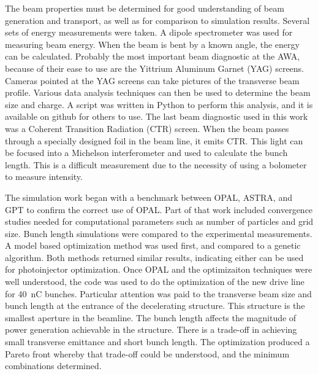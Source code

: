 The beam properties must be determined for good understanding of beam generation and transport, as well as for comparison to simulation results. Several sets of energy measurements were taken. A dipole spectrometer was used for measuring beam energy. 
When the beam is bent by a known angle, the energy can be calculated. 
Probably the most important beam diagnostic at the AWA, 
because of their ease to use are the Yittrium Aluminum Garnet (YAG) screens. 
Cameras pointed at the YAG screens can take pictures of the 
transverse beam profile. 
Various data analysis techniques can then be used to determine 
the beam size and charge. A script was written in Python
to perform this analysis, and it is available on github for others to use. 
The last beam diagnostic used in this work was a Coherent Transition Radiation (CTR) screen. When the beam passes
through a specially designed foil in the beam line, 
it emits CTR. This light can be focused into a Michelson 
interferometer and used to calculate the bunch length. 
This is a difficult measurement due to the necessity of using a 
bolometer to measure intensity. 

The simulation work began with a benchmark between OPAL, ASTRA, and GPT 
to confirm the correct use of OPAL. 
Part of that work included convergence studies needed for computational parameters such as number of particles and grid size.
Bunch length simulations were compared to the experimental 
measurements. 
A model based optimization method was used first, 
and compared to a genetic algorithm. 
Both methods returned similar results, indicating either
can be used for photoinjector optimization.  Once OPAL and the optimizaiton techniques were well understood, the code was used to do the optimization of the new drive line for \SI{40}{nC} bunches.  Particular attention was paid to the transverse beam size and bunch length at the entrance of the decelerating structure.  This structure is the smallest aperture in the beamline.  The bunch length affects the magnitude of power generation achievable in the structure.  There is a trade-off in achieving small transverse emittance and short bunch length.  The optimization produced a Pareto front whereby that trade-off could be understood, and the minimum combinations determined.

